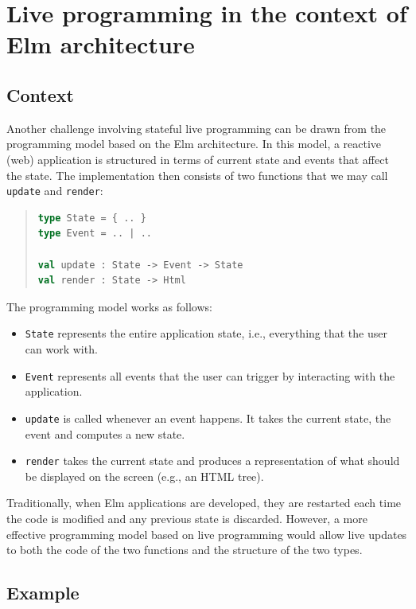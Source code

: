 \documentclass[english,submission]{programming}
\begin{document}
\section{Live programming in the context of Elm architecture}
\label{SECT:elm}
\subsection{Context}
Another challenge involving stateful live programming can be drawn from the programming model based on the Elm architecture. In this model, a reactive (web) application is structured in terms of current state and events that affect the state. The implementation then consists of two functions that we may call \texttt{update} and \texttt{render}:

\begin{quote}
\begin{lstlisting}[language=ml,morekeywords={on}]
type State = { .. }
type Event = .. | ..

val update : State -> Event -> State
val render : State -> Html
\end{lstlisting}
\end{quote}

The programming model works as follows:
\begin{itemize}
    \item \texttt{State} represents the entire application state, i.e., everything that the user can work with.
    \item \texttt{Event} represents all events that the user can trigger by interacting with the application.
    \item \texttt{update} is called whenever an event happens. It takes the current state, the event and computes a new state.
    \item \texttt{render} takes the current state and produces a representation of what should be displayed on the screen (e.g., an HTML tree).
\end{itemize}

Traditionally, when Elm applications are developed, they are restarted each time the code is modified and any previous state is discarded. However, a more effective programming model based on live programming would allow live updates to both the code of the two functions and the structure of the two types.

\subsection{Example}
\end{document}

